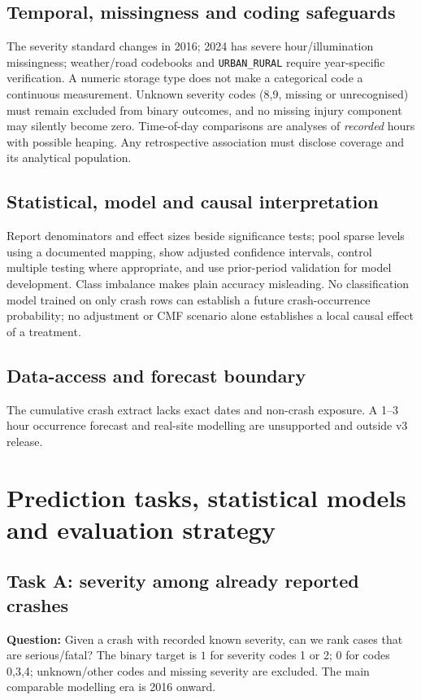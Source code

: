 \documentclass[11pt,a4paper,openany]{report}
\newcommand{\pathcode}[1]{\nolinkurl{#1}}
\begin{document}
\section{Temporal, missingness and coding safeguards}
The severity standard changes in 2016; 2024 has severe hour/illumination missingness; weather/road codebooks and \pathcode{URBAN_RURAL} require year-specific verification. A numeric storage type does not make a categorical code a continuous measurement. Unknown severity codes (8,9, missing or unrecognised) must remain excluded from binary outcomes, and no missing injury component may silently become zero. Time-of-day comparisons are analyses of \emph{recorded} hours with possible heaping. Any retrospective association must disclose coverage and its analytical population.

\section{Statistical, model and causal interpretation}
Report denominators and effect sizes beside significance tests; pool sparse levels using a documented mapping, show adjusted confidence intervals, control multiple testing where appropriate, and use prior-period validation for model development. Class imbalance makes plain accuracy misleading. No classification model trained on only crash rows can establish a future crash-occurrence probability; no adjustment or CMF scenario alone establishes a local causal effect of a treatment.

\section{Data-access and forecast boundary}
The cumulative crash extract lacks exact dates and non-crash exposure. A 1--3 hour occurrence forecast and real-site modelling are unsupported and outside v3 release.

\chapter{Prediction tasks, statistical models and evaluation strategy}
\section{Task A: severity among already reported crashes}
\textbf{Question:} Given a crash with recorded known severity, can we rank cases that are serious/fatal? The binary target is $1$ for severity codes 1 or 2; $0$ for codes 0,3,4; unknown/other codes and missing severity are excluded. The main comparable modelling era is 2016 onward.
\end{document}
